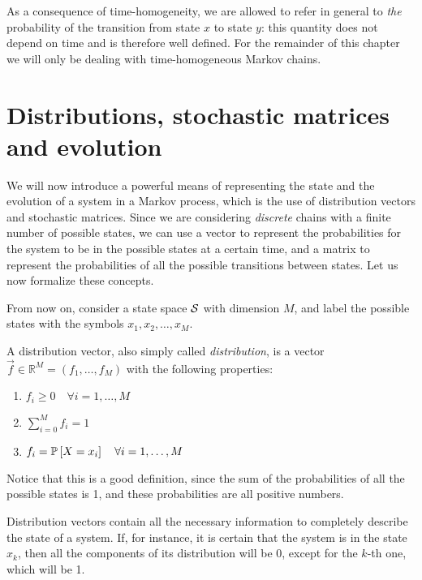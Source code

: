 As a consequence of time-homogeneity, we are allowed to refer in general to \emph{the} probability of the transition from state $x$ to state $y$: this quantity does not depend on time and is therefore well defined. For the remainder of this chapter we will only be dealing with time-homogeneous Markov chains.

\section{Distributions, stochastic matrices and evolution}
We will now introduce a powerful means of representing the state and the evolution of a system in a Markov process, which is the use of distribution vectors and stochastic matrices. Since we are considering \emph{discrete} chains with a finite number of possible states, we can use a vector to represent the probabilities for the system to be in the possible states at a certain time, and a matrix to represent the probabilities of all the possible transitions between states. Let us now formalize these concepts.

\smallskip
From now on, consider a state space $\mathcal{S}$ with dimension $M$, and label the possible states with the symbols $x_1, x_2, \dots, x_M$.

\begin{ndef} \label{def:distribution}
    A distribution vector, also simply called \emph{distribution}, is a vector $\vec{f} \in \mathbb{R}^M = (f_1, \dots, f_M)$ with the following properties:
    \begin{center}
        \begin{enumerate}
            \item $ f_i \geq 0 \quad \forall i = 1,\dots, M $
            \item $\sum_{i=0}^M f_i = 1$
            \item $f_i = \mathbb{P}\left[X = x_i\right] \quad \forall i = 1,\dots, M$
        \end{enumerate}
    \end{center}
    Notice that this is a good definition, since the sum of the probabilities of all the possible states is 1, and these probabilities are all positive numbers.
\end{ndef}

Distribution vectors contain all the necessary information to completely describe the state of a system. If, for instance, it is certain that the system is in the state $x_k$, then all the components of its distribution will be 0, except for the $k$-th one, which will be 1.

